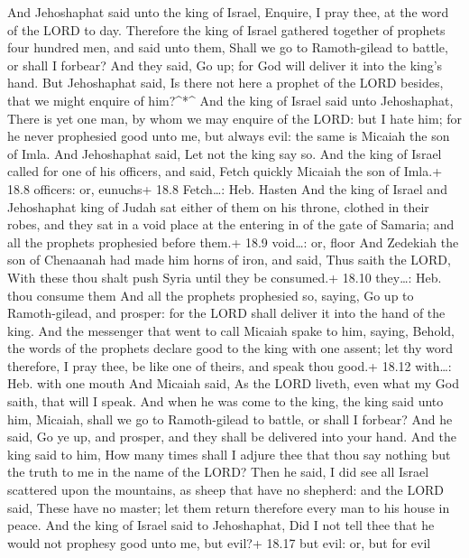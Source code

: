  And Jehoshaphat said unto the king of Israel, Enquire, I
pray thee, at the word of the LORD to day.  Therefore the
king of Israel gathered together of prophets four hundred men, and said
unto them, Shall we go to Ramoth-gilead to battle, or shall I forbear?
And they said, Go up; for God will deliver it into the king's hand.
 But Jehoshaphat said, Is there not here a prophet of the
LORD besides, that we might enquire of him?\^{}*\^{}  And
the king of Israel said unto Jehoshaphat, There is yet one man, by whom
we may enquire of the LORD: but I hate him; for he never prophesied good
unto me, but always evil: the same is Micaiah the son of Imla. And
Jehoshaphat said, Let not the king say so.  And the king of
Israel called for one of his officers, and said, Fetch quickly Micaiah
the son of Imla.+ 18.8 officers: or, eunuchs+ 18.8 Fetch\ldots: Heb.
Hasten  And the king of Israel and Jehoshaphat king of Judah
sat either of them on his throne, clothed in their robes, and they sat
in a void place at the entering in of the gate of Samaria; and all the
prophets prophesied before them.+ 18.9 void\ldots: or, floor
 And Zedekiah the son of Chenaanah had made him horns of
iron, and said, Thus saith the LORD, With these thou shalt push Syria
until they be consumed.+ 18.10 they\ldots: Heb. thou consume them
 And all the prophets prophesied so, saying, Go up to
Ramoth-gilead, and prosper: for the LORD shall deliver it into the hand
of the king.  And the messenger that went to call Micaiah
spake to him, saying, Behold, the words of the prophets declare good to
the king with one assent; let thy word therefore, I pray thee, be like
one of theirs, and speak thou good.+ 18.12 with\ldots: Heb. with one
mouth  And Micaiah said, As the LORD liveth, even what my
God saith, that will I speak.  And when he was come to the
king, the king said unto him, Micaiah, shall we go to Ramoth-gilead to
battle, or shall I forbear? And he said, Go ye up, and prosper, and they
shall be delivered into your hand.  And the king said to
him, How many times shall I adjure thee that thou say nothing but the
truth to me in the name of the LORD?  Then he said, I did
see all Israel scattered upon the mountains, as sheep that have no
shepherd: and the LORD said, These have no master; let them return
therefore every man to his house in peace.  And the king of
Israel said to Jehoshaphat, Did I not tell thee that he would not
prophesy good unto me, but evil?+ 18.17 but evil: or, but for evil
